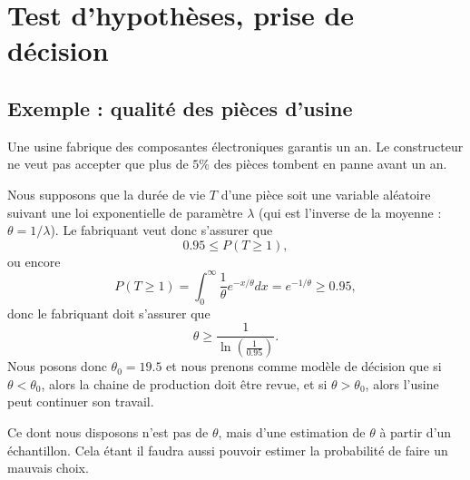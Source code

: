 \section{Test d'hypothèses, prise de décision}

\subsection{Exemple : qualité des pièces d'usine}

Une usine fabrique des composantes électroniques garantis un an. Le constructeur ne veut pas accepter que plus de \( 5\%\) des pièces tombent en panne avant un an.

Nous supposons que la durée de vie \( T\) d'une pièce soit une variable aléatoire suivant une loi exponentielle de paramètre \( \lambda\) (qui est l'inverse de la moyenne : \( \theta=1/\lambda\)). Le fabriquant veut donc s'assurer que
\begin{equation}
	0.95\leq P(T\geq 1),
\end{equation}
ou encore
\begin{equation}
	P(T\geq 1)=\int_0^{\infty}\frac{1}{ \theta } e^{-x/\theta}dx= e^{-1/\theta}\geq 0.95,
\end{equation}
donc le fabriquant doit s'assurer que
\begin{equation}
	\theta\geq\frac{1}{ \ln\left( \frac{1}{ 0.95 } \right) }.
\end{equation}
Nous posons donc \( \theta_0=19.5\) et nous prenons comme modèle de décision que si \( \theta<\theta_0\), alors la chaine de production doit être revue, et si \( \theta>\theta_0\), alors l'usine peut continuer son travail.

Ce dont nous disposons n'est pas de \( \theta\), mais d'une estimation de \( \theta\) à partir d'un échantillon. Cela étant il faudra aussi pouvoir estimer la probabilité de faire un mauvais choix.

